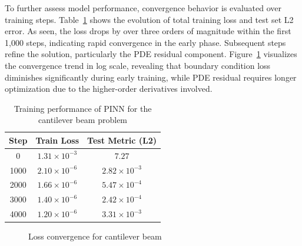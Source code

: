\documentclass[12pt]{article}
\begin{document}
To further assess model performance, convergence behavior is evaluated over training steps. Table~\ref{tab:cantilever_convergence} shows the evolution of total training loss and test set L2 error. As seen, the loss drops by over three orders of magnitude within the first 1,000 steps, indicating rapid convergence in the early phase. Subsequent steps refine the solution, particularly the PDE residual component. Figure~\ref{fig:cantilever_convergence} visualizes the convergence trend in log scale, revealing that boundary condition loss diminishes significantly during early training, while PDE residual requires longer optimization due to the higher-order derivatives involved.

\begin{table}[htbp]
    \centering
    \begin{tabular}{c c c}
        \toprule
        \textbf{Step} & \textbf{Train Loss} & \textbf{Test Metric (L2)} \\
        \midrule
        0 & $1.31 \times 10^{-3}$ & $7.27$ \\
        1000 & $2.10 \times 10^{-6}$ & $2.82 \times 10^{-3}$ \\
        2000 & $1.66 \times 10^{-6}$ & $5.47 \times 10^{-4}$ \\
        3000 & $1.40 \times 10^{-6}$ & $2.42 \times 10^{-4}$ \\
        4000 & $1.20 \times 10^{-6}$ & $3.31 \times 10^{-3}$ \\
        \bottomrule
    \end{tabular}
    \caption{Training performance of PINN for the cantilever beam problem}
    \label{tab:cantilever_convergence}
\end{table}

\begin{figure}[htbp]
    \centering
    \caption{Loss convergence for cantilever beam}
    \label{fig:cantilever_convergence}
\end{figure}
\end{document}
